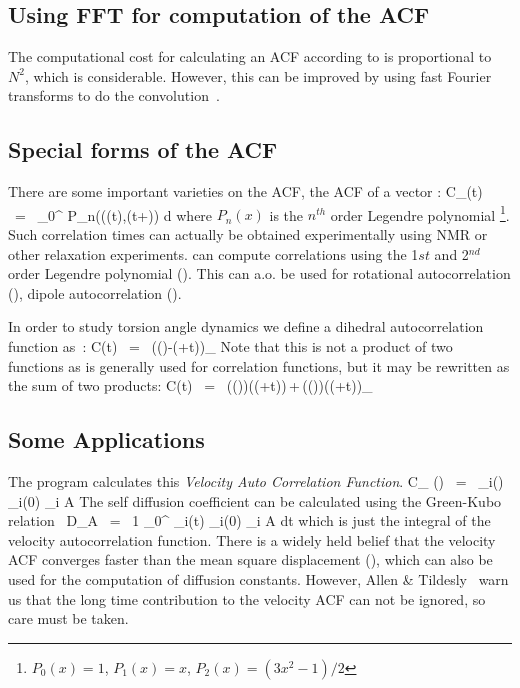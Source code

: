 \subsection{Using FFT for computation of the ACF}
The computational cost for calculating an ACF according to 
is proportional to $N^2$, which is considerable. However, this can be improved
by using fast Fourier transforms to do the convolution~\cite{Allen87}.

\subsection{Special forms of the ACF}
There are some important varieties on the ACF, {\eg} the ACF of a vector :
\beq
C_{}(t) ~=~       \int_0^{\infty} P_n(\cos\angle\left((t),(t+\xi)\right) {\rm d} \xi
\label{eqn:corrleg}
\eeq
where $P_n(x)$ is the $n^{th}$ order Legendre polynomial
\footnote{$P_0(x) = 1$, $P_1(x) = x$, $P_2(x) = (3x^2-1)/2$}.
Such correlation times 
can actually be obtained experimentally using {\eg} NMR or other relaxation 
experiments. {\gromacs} can compute correlations using 
the 1${st}$ and 2$^{nd}$ order Legendre polynomial ().
This can a.o. be used for rotational autocorrelation ({\tt {}}), 
dipole autocorrelation ({\tt {}}).

In order to study torsion angle dynamics we define a dihedral 
autocorrelation function as~\cite{Spoel97a}:
\beq
C(t)    ~=~     \left\langle \cos(\theta(\tau)-\theta(\tau+t))\right\rangle_{\tau}
\label{eqn:coenk}
\eeq
Note that this is not a  product of two functions 
as is generally used for correlation
functions, but it may be rewritten as the sum of two products:
\beq
C(t)    ~=~     \left\langle\cos(\theta(\tau))\cos(\theta(\tau+t))\,+\,\sin(\theta(\tau))\sin(\theta(\tau+t))\right\rangle_{\tau}
\label{eqn:cot}
\eeq

\subsection{Some Applications}
The program {\tt {}} calculates this {\em Velocity Auto Correlation 
Function}.
\beq
C_{} (\tau) ~=~ _i(\tau) _i(0) \rangle_{i \in A}
\eeq
The self diffusion coefficient can be calculated using the Green-Kubo 
relation~\cite{Allen87}
\beq
D_A ~=~ {1} \int_0^{\infty} _i(t) _i(0) \rangle_{i \in A} \; dt
\eeq
which is just the integral of the velocity autocorrelation function.
There is a widely held belief that the velocity ACF converges faster than the mean
square displacement (), which can also be used for the computation of 
diffusion constants. However, Allen \& Tildesly~\cite{Allen87} 
warn us that the long time 
contribution to the velocity ACF can not be ignored, so care must be taken.

